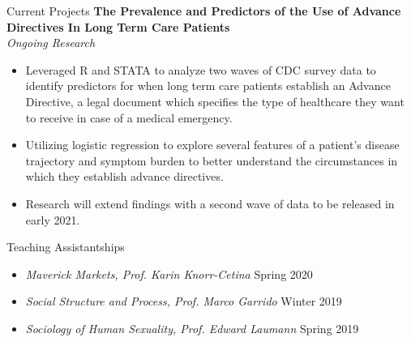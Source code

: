 \documentclass{resume}
\begin{document}
\begin{rSection}{Current Projects}
\noindent \textbf{The Prevalence and Predictors of the Use of Advance Directives In Long Term Care
Patients} \\
\textit{Ongoing Research} %
\begin{itemize}[noitemsep,nolistsep,leftmargin=*]
\item {Leveraged R and STATA to analyze two waves of CDC survey data to identify predictors for when long term care patients establish an Advance Directive, a legal document which specifies the type of healthcare they want to receive in case of a medical emergency.}
\item {Utilizing logistic regression to explore several features of a patient's disease trajectory and symptom burden to better understand the circumstances in which they establish advance directives.}
\item {Research will extend findings with a second wave of data to be released in early 2021. \\}
\end{itemize}

\end{rSection}

\begin{rSection}{Teaching Assistantships}
\begin{itemize}[noitemsep,nolistsep,leftmargin=*]
\item {\textit{Maverick Markets, Prof. Karin Knorr-Cetina} \hfill Spring 2020}
\item {\textit{Social Structure and Process, Prof. Marco Garrido} \hfill Winter 2019}
\item {\textit{Sociology of Human Sexuality, Prof. Edward Laumann} \hfill Spring 2019}
\end{itemize}

\end{rSection}
\end{document}
